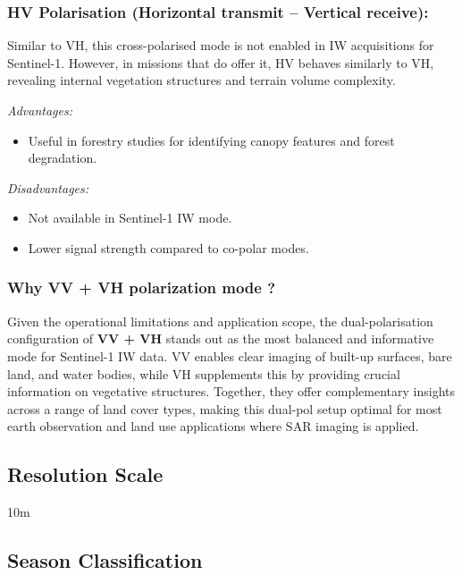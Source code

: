 \subsubsection{\textbf{HV Polarisation (Horizontal transmit – Vertical receive):}}

Similar to VH, this cross-polarised mode is not enabled in IW acquisitions for Sentinel-1. However, in missions that do offer it, HV behaves similarly to VH, revealing internal vegetation structures and terrain volume complexity.


\textit{Advantages:}
\begin{itemize}
    \item Useful in forestry studies for identifying canopy features and forest degradation.
\end{itemize}

\textit{Disadvantages:}
\begin{itemize}
    \item Not available in Sentinel-1 IW mode.
    \item Lower signal strength compared to co-polar modes.
\end{itemize}

\subsubsection{\textbf{Why VV + VH polarization mode ?}}

Given the operational limitations and application scope, the dual-polarisation configuration of \textbf{VV + VH} stands out as the most balanced and informative mode for Sentinel-1 IW data. VV enables clear imaging of built-up surfaces, bare land, and water bodies, while VH supplements this by providing crucial information on vegetative structures. Together, they offer complementary insights across a range of land cover types, making this dual-pol setup optimal for most earth observation and land use applications where SAR imaging is applied.



\subsection{Resolution Scale}

10m

\subsection{Season Classification}

